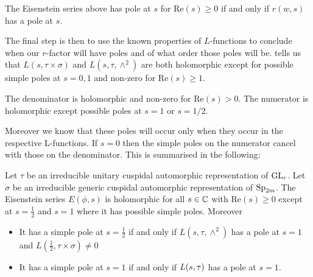      \begin{Lemma}
        The Eisenstein series above has pole at \(s\) for \(\mathrm{Re}(s)\geq 0\) if and only if \(r(w,s)\) has a pole at \(s\).
     \end{Lemma}
     The final step is then to use the known properties of \(L\)-functions to conclude when our \(r\)-factor will have poles and of what order those poles will be. \cite{jiangPolesCertainResidual2013} tells us that \(L(s, \tau\times \sigma)\) and \(L(s, \tau, \wedge^2)\) are both holomorphic except for possible simple poles at \(s=0, 1\) and non-zero for \(\mathrm{Re}(s)\geq 1\). 
     
     The denominator is holomorphic and non-zero for \(\mathrm{Re}(s)>0\).
	 The numerator is holomorphic except possible poles at \(s= 1\) or \(s=1/2\). 
	 
	 Moreover we know that these poles will occur only when they occur in the respective L-functions. If \(s=0\) then the simple poles on the numerator cancel with those on the denominator. This is summarised in the following:

    \begin{Theorem}
        Let \(\tau\) be an irreducible unitary cuspidal automorphic representation of \(\operatorname{GL}_r\). Let \(\sigma\) be an irreducible generic cuspidal automorphic representation of \(\operatorname{Sp}_{2m}\). The Eisenstein series \(E(\phi, s)\) is holomorphic for all \(s\in \C\) with \(\mathrm{Re}(s)\geq 0\) except at \(s = \frac{1}{2}\) and \(s= 1\) where it has possible simple poles. Moreover 
       	\begin{itemize}
       		\item It has a simple pole at \(s= \frac{1}{2}\) if and only if \(L(s, \tau, \wedge^2)\) has a pole at \(s=1\) and \(L(\frac{1}{2}, \tau\times \sigma)\neq 0\)
       		\item It has a simple pole at \(s=1\) if and only if \(L(s, \tau\time \sigma)\) has a pole at \(s=1\).
       	\end{itemize}
    \end{Theorem}
     